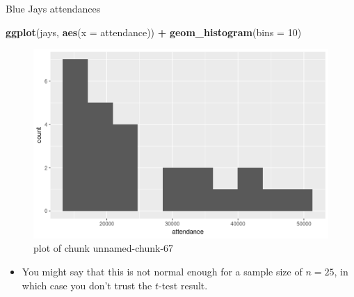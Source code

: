 \documentclass[ignorenonframetext,]{beamer}
\newenvironment{Shaded}{\begin{snugshade}}{\end{snugshade}}
\newcommand{\DataTypeTok}[1]{\textcolor[rgb]{0.13,0.29,0.53}{#1}}
\newcommand{\DecValTok}[1]{\textcolor[rgb]{0.00,0.00,0.81}{#1}}
\newcommand{\KeywordTok}[1]{\textcolor[rgb]{0.13,0.29,0.53}{\textbf{#1}}}
\newcommand{\NormalTok}[1]{#1}
\newcommand{\OperatorTok}[1]{\textcolor[rgb]{0.81,0.36,0.00}{\textbf{#1}}}
\newcommand{\StringTok}[1]{\textcolor[rgb]{0.31,0.60,0.02}{#1}}
\providecommand{\tightlist}{%
  \setlength{\itemsep}{0pt}\setlength{\parskip}{0pt}}
\begin{document}
\begin{frame}[fragile]{Blue Jays attendances}
\protect\hypertarget{blue-jays-attendances}{}

\begin{Shaded}
\begin{Highlighting}[]
\KeywordTok{ggplot}\NormalTok{(jays, }\KeywordTok{aes}\NormalTok{(}\DataTypeTok{x =}\NormalTok{ attendance)) }\OperatorTok{+}\StringTok{ }\KeywordTok{geom_histogram}\NormalTok{(}\DataTypeTok{bins =} \DecValTok{10}\NormalTok{)}
\end{Highlighting}
\end{Shaded}

\begin{figure}
\centering
\includegraphics{figure/unnamed-chunk-67-1.png}
\caption{plot of chunk unnamed-chunk-67}
\end{figure}

\begin{itemize}
\tightlist
\item
  You might say that this is not normal enough for a sample size of
  \(n = 25\), in which case you don't trust the \(t\)-test result.
\end{itemize}

\end{frame}
\end{document}
